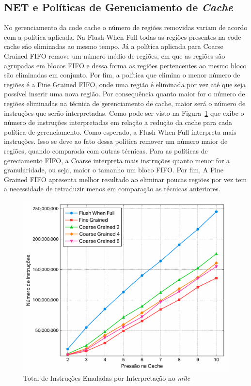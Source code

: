 \documentclass[11pt,twoside]{article}
\begin{document}
\subsection{NET e Políticas de Gerenciamento de \emph{Cache}}

No gerenciamento da code cache o número de regiões removidas variam de acordo com a política aplicada. Na Flush When Full todas as regiões presentes na code cache são eliminadas ao mesmo tempo. Já a política aplicada para Coarse Grained FIFO remove um número médio de regiões, em que as regiões são agrupadas em blocos FIFO e dessa forma as regiões pertencentes ao mesmo bloco são eliminadas em conjunto. Por fim, a política que elimina o menor número de regiões é a Fine Grained FIFO, onde uma região é eliminada por vez até que seja possível inserir uma nova região.
Por consequência quanto maior for o número de regiões eliminadas na técnica de gerenciamento de cache, maior será o número de instruções que serão interpretadas. Como pode ser visto na Figura~\ref{fig:freq_nte}  que exibe o número de instruções interpretadas em relação a redução da cache para cada política de gerenciamento. Como esperado, a Flush When Full interpreta mais instruções. Isso se deve ao fato dessa política remover um número maior de regiões, quando comparada com outras técnicas. Para as políticas de gereciamento FIFO, a Coarse interpreta mais instruções quanto menor for a granularidade, ou seja, maior o tamanho um bloco FIFO. Por fim, A Fine Grained FIFO apresenta melhor resultado ao eliminar poucas regiões por vez tem a necessidade de retraduzir menos em comparação as técnicas anteriores. 

\begin{figure}[!ht]
	\centering
\includegraphics[scale=0.4]{./figs/milc-interp-inst}
\caption{Total de Instruções Emuladas por Interpretação no \emph{milc}}
\label{fig:freq_nte}
\end{figure}
\end{document}
